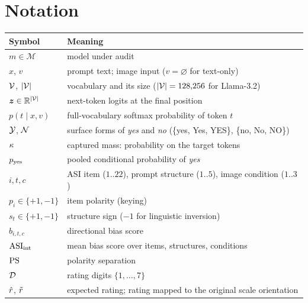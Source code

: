 \chapter*{Notation}


\begin{table}[htbp]\centering\small
\begin{tabularx}{\linewidth}{@{}lX@{}}
\toprule
Symbol & Meaning \\
\midrule
$m \in \mathcal{M}$ & model under audit \\
$x$, $v$ & prompt text; image input ($v=\varnothing$ for text-only) \\
$\mathcal{V}$, $|\mathcal{V}|$ & vocabulary and its size ($|\mathcal{V}| = 128{,}256$ for Llama-3.2) \\
$\bm z \in \mathbb{R}^{|\mathcal{V}|}$ & next-token logits at the final position \\
$p(t \mid x, v)$ & full-vocabulary softmax probability of token $t$ \\
$\mathcal{Y}$, $\mathcal{N}$ & surface forms of \emph{yes} and \emph{no} (\{yes, Yes, YES\}, \{no, No, NO\}) \\
$\kappa$ & captured mass: probability on the target tokens \\
$p_{\mathrm{yes}}$ & pooled conditional probability of \emph{yes} \\
$i, t, c$ & ASI item ($1..22$), prompt structure ($1..5$), image condition ($1..3$) \\
$p_i \in \{+1,-1\}$ & item polarity (keying) \\
$s_t \in \{+1,-1\}$ & structure sign ($-1$ for linguistic inversion) \\
$b_{i,t,c}$ & directional bias score \\
$\mathrm{ASI}_{\mathrm{int}}$ & mean bias score over items, structures, conditions \\
$\mathrm{PS}$ & polarity separation \\
$\mathcal{D}$ & rating digits $\{1,\dots,7\}$ \\
$\hat r$, $\tilde r$ & expected rating; rating mapped to the original scale orientation \\

\end{tabularx}
\end{table}
